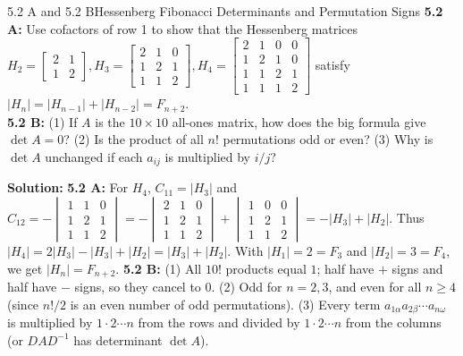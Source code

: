 \documentclass[11pt,a4paper,openany,oneside]{book}
\numberwithin{equation}{chapter}
\begin{document}
\begin{example}{5.2 A and 5.2 B}{Hessenberg Fibonacci Determinants and Permutation Signs}
\textbf{5.2 A:} Use cofactors of row 1 to show that the Hessenberg matrices $H_2=\begin{bmatrix}2&1\\1&2\end{bmatrix}, H_3=\begin{bmatrix}2&1&0\\1&2&1\\1&1&2\end{bmatrix}, H_4=\begin{bmatrix}2&1&0&0\\1&2&1&0\\1&1&2&1\\1&1&1&2\end{bmatrix}$ satisfy $|H_n| = |H_{n-1}| + |H_{n-2}| = F_{n+2}$.\\
\textbf{5.2 B:} (1) If $A$ is the $10\times 10$ all-ones matrix, how does the big formula give $\det A = 0$? (2) Is the product of all $n!$ permutations odd or even? (3) Why is $\det A$ unchanged if each $a_{ij}$ is multiplied by $i/j$?
\end{example}
\textbf{Solution:}
\textbf{5.2 A:} For $H_4$, $C_{11} = |H_3|$ and $C_{12} = -\begin{vmatrix}1&1&0\\1&2&1\\1&1&2\end{vmatrix} = -\begin{vmatrix}2&1&0\\1&2&1\\1&1&2\end{vmatrix} + \begin{vmatrix}1&0&0\\1&2&1\\1&1&2\end{vmatrix} = -|H_3| + |H_2|$. Thus $|H_4| = 2|H_3| - |H_3| + |H_2| = |H_3| + |H_2|$. With $|H_1|=2=F_3$ and $|H_2|=3=F_4$, we get $|H_n| = F_{n+2}$.
\textbf{5.2 B:} (1) All $10!$ products equal $1$; half have $+$ signs and half have $-$ signs, so they cancel to $0$. (2) Odd for $n=2,3$, and even for all $n \ge 4$ (since $n!/2$ is an even number of odd permutations). (3) Every term $a_{1\alpha}a_{2\beta}\cdots a_{n\omega}$ is multiplied by $1\cdot 2\cdots n$ from the rows and divided by $1\cdot 2\cdots n$ from the columns (or $DAD^{-1}$ has determinant $\det A$).
\end{document}
